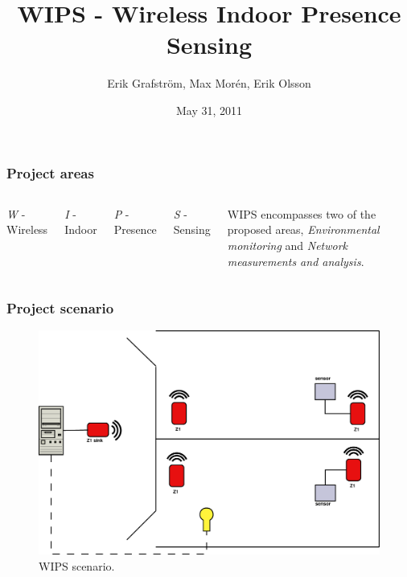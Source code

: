 \documentclass{beamer}
\title{WIPS - Wireless Indoor Presence Sensing}
\author{Erik Grafström, Max Morén, Erik Olsson}
\date{May 31, 2011}
\begin{document}
\begin{frame}
	\titlepage
\end{frame}

\begin{frame}
\frametitle{Project areas}

	\begin{columns}


	\begin{block}

		\emph{W} - Wireless

	\end{block}

	\begin{block}

		\emph{I} - Indoor
	
	\end{block}
	
	\begin{block}
	
		\emph{P} - Presence

	\end{block}

	\begin{block}
	
		\emph{S} - Sensing

	\end{block}


	WIPS encompasses two of the proposed areas, \emph{Environmental monitoring} 
	and \emph{Network measurements and analysis}.
	
	\end{columns}

\end{frame} 

\begin{frame}
\frametitle{Project scenario}
	
	\begin{figure}
		\includegraphics[width=\textwidth]{system.eps}
		\caption{WIPS scenario.}
	\end{figure}
	
\end{frame}
\end{document}

